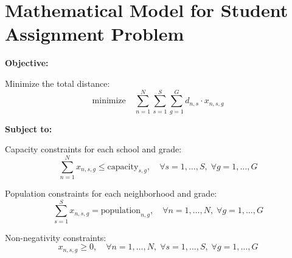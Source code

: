 \documentclass{article}
\begin{document}
\section*{Mathematical Model for Student Assignment Problem}

\textbf{Objective:}

Minimize the total distance:
\[
\text{minimize} \quad \sum_{n=1}^{N} \sum_{s=1}^{S} \sum_{g=1}^{G} d_{n,s} \cdot x_{n,s,g}
\]

\textbf{Subject to:}

Capacity constraints for each school and grade:
\[
\sum_{n=1}^{N} x_{n,s,g} \leq \text{capacity}_{s,g}, \quad \forall s = 1, \ldots, S, \; \forall g = 1, \ldots, G
\]

Population constraints for each neighborhood and grade:
\[
\sum_{s=1}^{S} x_{n,s,g} = \text{population}_{n,g}, \quad \forall n = 1, \ldots, N, \; \forall g = 1, \ldots, G
\]

Non-negativity constraints:
\[
x_{n,s,g} \geq 0, \quad \forall n = 1, \ldots, N, \; \forall s = 1, \ldots, S, \; \forall g = 1, \ldots, G
\]
\end{document}
